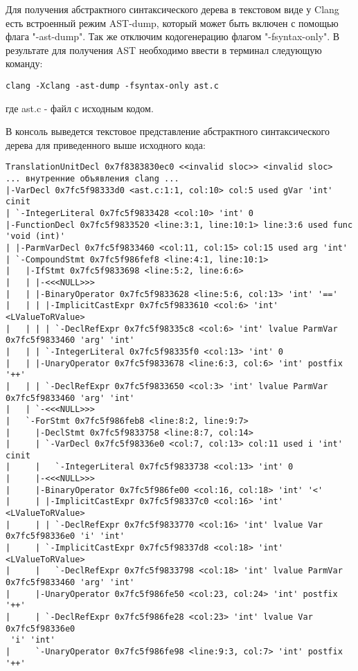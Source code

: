 Для получения абстрактного синтаксического дерева в текстовом виде у Clang есть встроенный 
режим AST-dump, который может быть включен с помощью флага "-ast-dump". Так же отключим кодогенерацию
флагом "-fsyntax-only". В результате для получения AST необходимо ввести в терминал следующую команду:
\begin{lstlisting}
clang -Xclang -ast-dump -fsyntax-only ast.c
\end{lstlisting}
где ast.c - файл с исходным кодом.

В консоль выведется текстовое представление абстрактного синтаксического дерева для приведенного выше исходного кода:
\begin{lstlisting}[basicstyle=\tiny]
TranslationUnitDecl 0x7f8383830ec0 <<invalid sloc>> <invalid sloc>
... внутренние объявления clang ...
|-VarDecl 0x7fc5f98333d0 <ast.c:1:1, col:10> col:5 used gVar 'int' cinit
| `-IntegerLiteral 0x7fc5f9833428 <col:10> 'int' 0
|-FunctionDecl 0x7fc5f9833520 <line:3:1, line:10:1> line:3:6 used func 
'void (int)'
| |-ParmVarDecl 0x7fc5f9833460 <col:11, col:15> col:15 used arg 'int'
| `-CompoundStmt 0x7fc5f986fef8 <line:4:1, line:10:1>
|   |-IfStmt 0x7fc5f9833698 <line:5:2, line:6:6>
|   | |-<<<NULL>>>
|   | |-BinaryOperator 0x7fc5f9833628 <line:5:6, col:13> 'int' '=='
|   | | |-ImplicitCastExpr 0x7fc5f9833610 <col:6> 'int' <LValueToRValue>
|   | | | `-DeclRefExpr 0x7fc5f98335c8 <col:6> 'int' lvalue ParmVar 
0x7fc5f9833460 'arg' 'int'
|   | | `-IntegerLiteral 0x7fc5f98335f0 <col:13> 'int' 0
|   | |-UnaryOperator 0x7fc5f9833678 <line:6:3, col:6> 'int' postfix '++'
|   | | `-DeclRefExpr 0x7fc5f9833650 <col:3> 'int' lvalue ParmVar 
0x7fc5f9833460 'arg' 'int'
|   | `-<<<NULL>>>
|   `-ForStmt 0x7fc5f986feb8 <line:8:2, line:9:7>
|     |-DeclStmt 0x7fc5f9833758 <line:8:7, col:14>
|     | `-VarDecl 0x7fc5f98336e0 <col:7, col:13> col:11 used i 'int' cinit
|     |   `-IntegerLiteral 0x7fc5f9833738 <col:13> 'int' 0
|     |-<<<NULL>>>
|     |-BinaryOperator 0x7fc5f986fe00 <col:16, col:18> 'int' '<'
|     | |-ImplicitCastExpr 0x7fc5f98337c0 <col:16> 'int' <LValueToRValue>
|     | | `-DeclRefExpr 0x7fc5f9833770 <col:16> 'int' lvalue Var 
0x7fc5f98336e0 'i' 'int'
|     | `-ImplicitCastExpr 0x7fc5f98337d8 <col:18> 'int' <LValueToRValue>
|     |   `-DeclRefExpr 0x7fc5f9833798 <col:18> 'int' lvalue ParmVar 
0x7fc5f9833460 'arg' 'int'
|     |-UnaryOperator 0x7fc5f986fe50 <col:23, col:24> 'int' postfix '++'
|     | `-DeclRefExpr 0x7fc5f986fe28 <col:23> 'int' lvalue Var 0x7fc5f98336e0
 'i' 'int'
|     `-UnaryOperator 0x7fc5f986fe98 <line:9:3, col:7> 'int' postfix '++'

\end{lstlisting}
